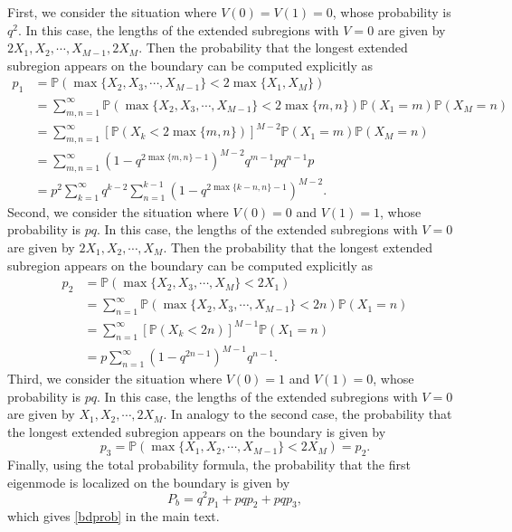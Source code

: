 \documentclass[a4paper,11pt]{article}
\begin{document}
\begin{appendices}
First, we consider the situation where $V(0) = V(1) = 0$, whose probability is $q^2$. In this case, the lengths of the extended subregions with $V = 0$ are given by $2 X_1, X_2, \cdots, X_{M-1}, 2 X_M$. Then the probability that the longest extended subregion appears on the boundary can be computed explicitly as
\begin{equation*}
\begin{split}
p_1 &= \mathbb{P}(\max\{X_2, X_3, \cdots, X_{M-1}\} < 2 \max\{X_1, X_M\}) \\
&= \sum_{m,n=1}^{\infty} \mathbb{P}(\max\{X_2, X_3, \cdots, X_{M-1}\} < 2 \max\{m,  n\}) \mathbb{P}(X_1 = m) \mathbb{P}(X_M = n) \\
&= \sum_{m,n=1}^{\infty} [\mathbb{P}(X_k < 2 \max\{m,n\}) ]^{M-2} \mathbb{P}(X_1 = m) \mathbb{P}(X_M = n)\\
&= \sum_{m,n=1}^{\infty} (1 - q^{2 \max\{m,n\}-1})^{M-2} q^{m-1} p q^{n-1} p\\
&= p^2\sum_{k=1}^{\infty} q^{k-2} \sum_{n=1}^{k-1} (1 - q^{2 \max\{k-n,n\}-1})^{M-2}.
\end{split}
\end{equation*}
Second, we consider the situation where $V(0) = 0$ and $V(1) = 1$, whose probability is $p q$. In this case, the lengths of the extended subregions with $V = 0$ are given by $2 X_1, X_2, \cdots, X_M$. Then the probability that the longest extended subregion appears on the boundary can be computed explicitly as
\begin{equation*}
\begin{split}
p_2 &= \mathbb{P}(\max\{X_2, X_3, \cdots, X_{M}\} < 2 X_1) \\
&= \sum_{n=1}^{\infty} \mathbb{P}(\max\{X_2, X_3, \cdots, X_{M-1}\} < 2 n) \mathbb{P}(X_1 = n) \\
&= \sum_{n=1}^{\infty} [\mathbb{P}(X_k < 2 n)]^{M-1} \mathbb{P}(X_1 = n)\\
&= p \sum_{n=1}^{\infty} (1-q^{2n-1})^{M-1} q^{n-1}.
\end{split}
\end{equation*}
Third, we consider the situation where $V(0) = 1$ and $V(1) = 0$, whose probability is $p q$. In this case, the lengths of the extended subregions with $V = 0$ are given by $X_1, X_2, \cdots, 2X_M$. In analogy to the second case, the probability that the longest extended subregion appears on the boundary is given by
\begin{equation*}
p_3 = \mathbb{P}(\max\{X_1, X_2, \cdots, X_{M-1}\} < 2 X_M) = p_2.
\end{equation*}
Finally, using the total probability formula, the probability that the first eigenmode is localized on the boundary is given by
\begin{equation*}
P_b = q^2p_1+pqp_2+pqp_3,
\end{equation*}
which gives \eqref{bdprob} in the main text.



\end{appendices}
\end{document}
